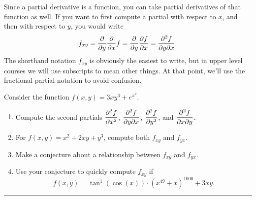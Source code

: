 Since a partial derivative is a function, you can take partial derivatives of that function as well.  If you want to first compute a partial with respect to $x$, and then with respect to $y$, you would write $$f_{xy}=\displaystyle\frac{\partial}{\partial y}\frac{\partial}{\partial x}f = \frac{\partial}{\partial y}\frac{\partial f}{\partial x} = \frac{\partial^2 f}{\partial y \partial x}.$$
The shorthand notation $f_{xy}$ is obviously the easiest to write, but in upper level courses we will use subscripts to mean other things. At that point, we'll use the fractional partial notation to avoid confusion.


\begin{problem}
Consider the function $f(x,y)=3xy^3+e^{x^2}.$
\begin{enumerate}
 \item Compute the second partials $\displaystyle \frac{\partial^2 f}{ \partial x^2}$, $\displaystyle\frac{\partial^2 f}{\partial y \partial x}$, $\displaystyle\frac{\partial^2 f}{\partial y^2}$, and $\displaystyle\frac{\partial^2 f}{\partial x \partial y}$.
 \item For $f(x,y)=x^2+2xy+y^3$, compute both $f_{xy}$ and $f_{yx}$.  
 \item Make a conjecture about a relationship between $f_{xy}$ and $f_{yx}$.
 \item Use your conjecture to quickly compute $f_{xy}$ if $$f(x,y)=\tan^{1}(\cos(x))\cdot (x^{49}+x)^{1000}+3xy.$$ 
\end{enumerate}
\hrule\end{problem}



